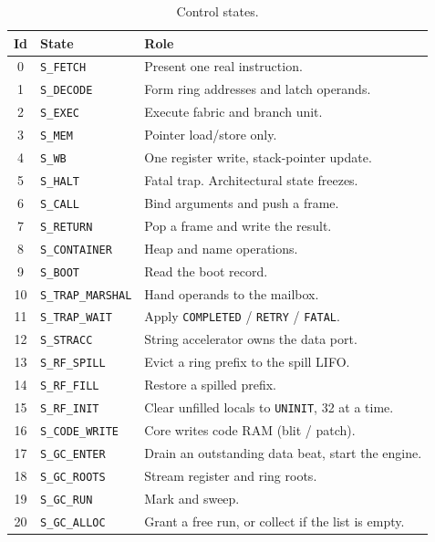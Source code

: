 \documentclass[11pt,a4paper]{article}
\begin{document}
\begin{table}[htbp]
\centering
\caption{Control states.}
\label{tab:states}
\footnotesize
\begin{tabular}{@{}clp{}@{}}
\toprule
Id & State & Role \\
\midrule
0 & \texttt{S\_FETCH} & Present one real instruction. \\
1 & \texttt{S\_DECODE} & Form ring addresses and latch operands. \\
2 & \texttt{S\_EXEC} & Execute fabric and branch unit. \\
3 & \texttt{S\_MEM} & Pointer load/store only. \\
4 & \texttt{S\_WB} & One register write, stack-pointer update. \\
5 & \texttt{S\_HALT} & Fatal trap. Architectural state freezes. \\
6 & \texttt{S\_CALL} & Bind arguments and push a frame. \\
7 & \texttt{S\_RETURN} & Pop a frame and write the result. \\
8 & \texttt{S\_CONTAINER} & Heap and name operations. \\
9 & \texttt{S\_BOOT} & Read the boot record. \\
10 & \texttt{S\_TRAP\_MARSHAL} & Hand operands to the mailbox. \\
11 & \texttt{S\_TRAP\_WAIT} & Apply \texttt{COMPLETED} / \texttt{RETRY} / \texttt{FATAL}. \\
12 & \texttt{S\_STRACC} & String accelerator owns the data port. \\
13 & \texttt{S\_RF\_SPILL} & Evict a ring prefix to the spill LIFO. \\
14 & \texttt{S\_RF\_FILL} & Restore a spilled prefix. \\
15 & \texttt{S\_RF\_INIT} & Clear unfilled locals to \texttt{UNINIT}, 32 at a time. \\
16 & \texttt{S\_CODE\_WRITE} & Core writes code RAM (blit / patch). \\
17 & \texttt{S\_GC\_ENTER} & Drain an outstanding data beat, start the engine. \\
18 & \texttt{S\_GC\_ROOTS} & Stream register and ring roots. \\
19 & \texttt{S\_GC\_RUN} & Mark and sweep. \\
20 & \texttt{S\_GC\_ALLOC} & Grant a free run, or collect if the list is empty. \\
\bottomrule
\end{tabular}
\end{table}
\end{document}
